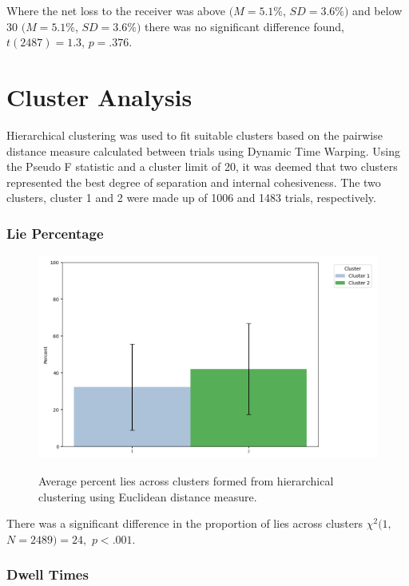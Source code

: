 \documentclass[man, floatsintext]{apa7}
\begin{document}
Where the net loss to the receiver was above $(M = 5.1\%$, $SD = 3.6\%)$ and below 30 $(M = 5.1\%$, $SD = 3.6\%)$ there was no significant difference found, $t(2487)=1.3$, $p=.376$.

\section{Cluster Analysis}

Hierarchical clustering was used to fit suitable clusters based on the pairwise distance measure calculated between trials using Dynamic Time Warping. Using the Pseudo F statistic and a cluster limit of 20, it was deemed that two clusters represented the best degree of separation and internal cohesiveness. The two clusters, cluster 1 and 2 were made up of 1006 and 1483 trials, respectively.


\subsubsection{Lie Percentage}

\begin{figure}[H]
	\caption{Average percent lies across clusters formed from hierarchical clustering using Euclidean distance measure.}
	\includegraphics[width=\linewidth]{../plots/ALLTRIAL/PercentLies.png}
	\label{fig:PercentLiePerCluster}
\end{figure}

There was a significant difference in the proportion of lies across clusters $\chi^2(1,$ $N=2489) = 24,$ $p<.001$.

\subsubsection{Dwell Times}
\end{document}
